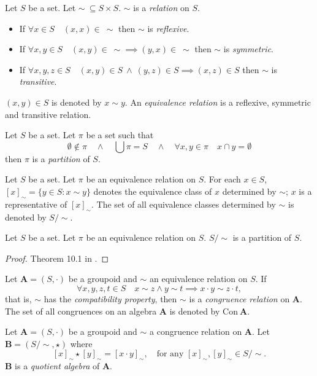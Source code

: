 \documentclass{../mcom-l}
\begin{document}
\begin{definition}\cite{warner1990modern} 
Let $S$ be a set. Let $\sim~\subseteq S \times S$. $\sim$ is a \emph{relation} on $S$.
\begin{itemize}
    \item If $\forall x \in S\quad (x,x)\in~\sim$ then $\sim$ is \emph{reflexive}.
    \item If $\forall x,y \in S\quad (x,y)\in~\sim\implies(y,x)\in~\sim$ then $\sim$ is \emph{symmetric}.
    \item If $\forall x,y,z \in S\quad (x,y)\in S~\land~(y,z)\in S \implies(x,z)\in S$ then $\sim$ is \emph{transitive}.
\end{itemize}
$(x,y) \in S$ is denoted by $x\sim y$.\newline
An \emph{equivalence relation} is a reflexive, symmetric and transitive relation.
\end{definition}
\begin{definition}\cite{warner1990modern} 
Let $S$ be a set. Let $\pi$ be a set such that 
\[\emptyset \not\in \pi \quad \land \quad \bigcup\pi=S \quad \land\quad \forall x,y\in\pi \quad x\cap y=\emptyset \]
then $\pi$ is a \emph{partition} of $S$.
\end{definition}

\begin{definition}\cite{warner1990modern} 
Let $S$ be a set. Let $\pi$ be an equivalence relation on $S$. For each $x\in S$, $[x]_\sim = \{y \in S : x \sim y\}$ denotes the equivalence class of $x$ determined by $\sim$; $x$ is a representative of $[x]_\sim$. \newline The set of all equivalence classes determined by $\sim$ is denoted by $S/\sim$.
\end{definition}

\begin{theorem}
Let $S$ be a set. Let $\pi$ be an equivalence relation on $S$.\newline
$S/\sim$ is a partition of $S$.
\begin{proof}
Theorem 10.1 in \cite{warner1990modern}.
\end{proof}
\end{theorem}

\begin{definition}\cite{burris1981course}
Let $\mathbf{A}=(S,\cdot)$ be a groupoid and $\sim$ an equivalence relation on $S$. If
\[\forall x,y,z,t \in S \quad x \sim z \land y \sim t \implies x \cdot y \sim z \cdot t,\]
that is, $\sim$ has the \emph{compatibility property}, then $\sim$ is a \emph{congruence relation} on $\mathbf{A}$. The set of all congruences on an algebra $\mathbf{A}$ is denoted by $\text{Con}~\mathbf{A}$.
\end{definition}

\begin{definition}\cite{burris1981course}
Let $\mathbf{A}=(S,\cdot)$ be a groupoid and $\sim$ a congruence relation on $\mathbf{A}$. Let $\mathbf{B} = (S/\sim, \star)$ where \[[x]_\sim \star [y]_\sim = [x \cdot y]_\sim,\quad \text{for any }[x]_\sim,[y]_\sim \in S/\sim.\]
$\mathbf{B}$ is a \emph{quotient algebra} of $\mathbf{A}$. 
\end{definition}
\end{document}
